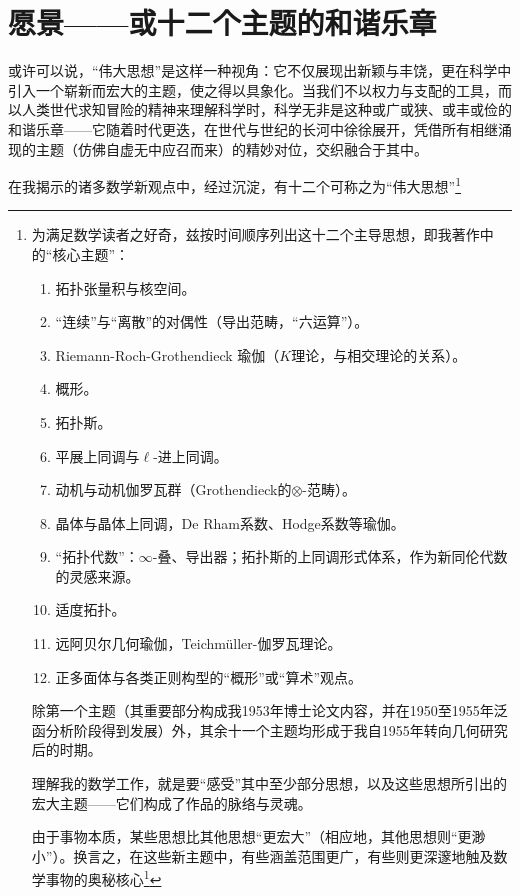 
\section{愿景——或十二个主题的和谐乐章}

或许可以说，“伟大思想”是这样一种视角：它不仅展现出新颖与丰饶，更在科学中引入一个崭新而宏大的主题，使之得以具象化。当我们不以权力与支配的工具，而以人类世代求知冒险的精神来理解科学时，科学无非是这种或广或狭、或丰或俭的和谐乐章——它随着时代更迭，在世代与世纪的长河中徐徐展开，凭借所有相继涌现的主题（仿佛自虚无中应召而来）的精妙对位，交织融合于其中。

在我揭示的诸多数学新观点中，经过沉淀，有十二个可称之为“伟大思想”\footnote{为满足数学读者之好奇，兹按时间顺序列出这十二个主导思想，即我著作中的“核心主题”：

\begin{enumerate}
    \item 拓扑张量积与核空间。
    \item “连续”与“离散”的对偶性（导出范畴，“六运算”）。
    \item Riemann-Roch-Grothendieck 瑜伽（$K$理论，与相交理论的关系）。
    \item 概形。
    \item 拓扑斯。
    \item 平展上同调与$\ell$-进上同调。
    \item 动机与动机伽罗瓦群（Grothendieck的$\otimes$-范畴）。
    \item 晶体与晶体上同调，De Rham系数、Hodge系数等瑜伽。
    \item “拓扑代数”：$\infty$-叠、导出器；拓扑斯的上同调形式体系，作为新同伦代数的灵感来源。
    \item 适度拓扑。
    \item 远阿贝尔几何瑜伽，Teichmüller-伽罗瓦理论。
    \item 正多面体与各类正则构型的“概形”或“算术”观点。
\end{enumerate}

除第一个主题（其重要部分构成我1953年博士论文内容，并在1950至1955年泛函分析阶段得到发展）外，其余十一个主题均形成于我自1955年转向几何研究后的时期。

理解我的数学工作，就是要“感受”其中至少部分思想，以及这些思想所引出的宏大主题——它们构成了作品的脉络与灵魂。

由于事物本质，某些思想比其他思想“更宏大”（相应地，其他思想则“更渺小”）。换言之，在这些新主题中，有些涵盖范围更广，有些则更深邃地触及数学事物的奥秘核心\footnote{其中，我认为范畴最广的是拓扑斯，它提供了代数几何、拓扑与算术的综合理念。就目前已产生的成果广度而言，最突出的是概形主题（参见第20页脚注(*)）。它为八项其他主题（即除第1、5、10项外的所有主题）提供了卓越框架，同时彻底革新了代数几何及其语言体系的核心概念。

}}
